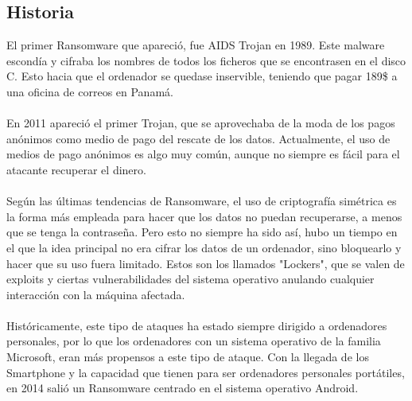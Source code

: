 \documentclass[a4paper,12pt]{article}
\begin{document}
\subsection{Historia}
El primer Ransomware que apareció, fue AIDS Trojan en 1989. Este malware escondía y cifraba los nombres de todos los ficheros que se encontrasen en el disco C. Esto hacia que el ordenador se quedase inservible, teniendo que pagar 189\$ a una oficina de correos en Panamá.\\\\
En 2011 apareció el primer Trojan, que se aprovechaba de la moda de los pagos anónimos como medio de pago del rescate de los datos. Actualmente, el uso de medios de pago anónimos es algo muy común, aunque no siempre es fácil para el atacante recuperar el dinero.\\\\
Según las últimas tendencias de Ransomware, el uso de criptografía simétrica es la forma más empleada para hacer que los datos no puedan recuperarse, a menos que se tenga la contraseña. Pero esto no siempre ha sido así, hubo un tiempo en el que la idea principal no era cifrar los datos de un ordenador, sino bloquearlo y hacer que su uso fuera limitado. Estos son los llamados "Lockers", que se valen de exploits y ciertas vulnerabilidades del sistema operativo anulando cualquier interacción con la máquina afectada.\\\\
Históricamente, este tipo de ataques ha estado siempre dirigido a ordenadores personales, por lo que los ordenadores con un sistema operativo de la familia Microsoft, eran más propensos a este tipo de ataque. Con la llegada de los Smartphone y la capacidad que tienen para ser ordenadores personales portátiles, en 2014 salió un Ransomware centrado en el sistema operativo Android. 
\end{document}
